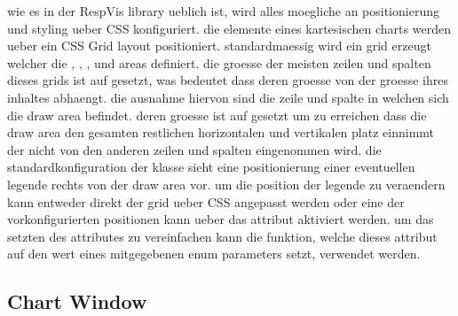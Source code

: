 wie es in der RespVis library ueblich ist, wird alles moegliche an positionierung und styling ueber CSS konfiguriert.
die elemente eines kartesischen charts werden ueber ein CSS Grid layout positioniert.
standardmaessig wird ein grid erzeugt welcher die , , , und  areas definiert.
die groesse der meisten zeilen und spalten dieses grids ist auf  gesetzt, was bedeutet dass deren groesse von der groesse ihres inhaltes abhaengt. 
die ausnahme hiervon sind die zeile und spalte in welchen sich die draw area befindet.
deren groesse ist auf  gesetzt um zu erreichen dass die draw area den gesamten restlichen horizontalen und vertikalen platz einnimmt der nicht von den anderen zeilen und spalten eingenommen wird.
die standardkonfiguration der  klasse sieht eine positionierung einer eventuellen legende rechts von der draw area vor.
um die position der legende zu veraendern kann entweder direkt der grid ueber CSS angepasst werden oder eine der vorkonfigurierten positionen kann ueber das  attribut aktiviert werden.
um das setzten des  attributes zu vereinfachen kann die  funktion, welche dieses attribut auf den wert eines mitgegebenen  enum parameters setzt, verwendet werden.


\subsection{Chart Window}




